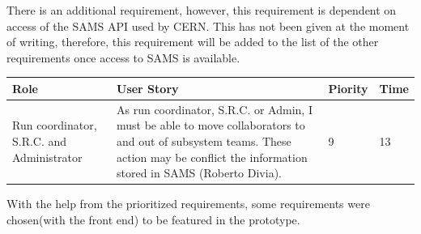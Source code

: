 \documentclass[paper=a4, fontsize=11pt,twoside]{scrartcl}	%
\begin{document}
There is an additional requirement, however, this requirement is dependent on access of the SAMS API used by CERN. This has not been given at the moment of writing, therefore, this requirement will be added to the list of the other requirements once access to SAMS is available. \\

\begin{longtable}{ | p{3cm} | p{8cm} | p{1cm} | l |}
\hline
Role & User Story & Piority & Time \\ \hline
Run coordinator, S.R.C. and Administrator &  As run coordinator, S.R.C. or Admin, I must be able to move collaborators to and out of subsystem teams. These action may be conflict the information stored in SAMS (Roberto Divia). & 9 & 13 \\ \hline
\end{longtable}

With the help from the prioritized requirements, some requirements were chosen(with the front end) to be featured in the prototype. 
\newpage
\end{document}
